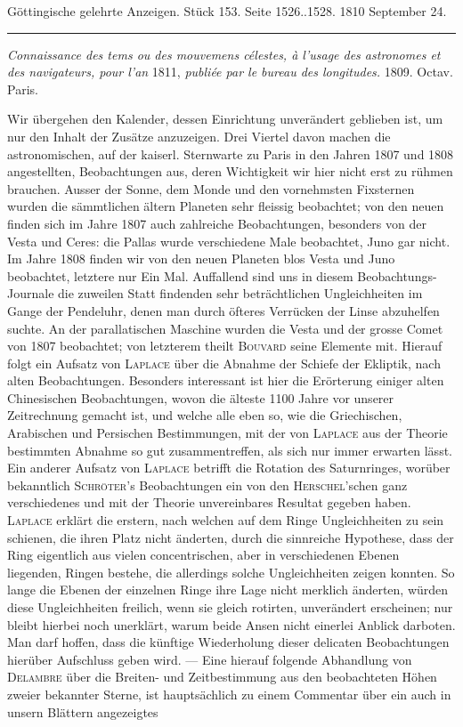 \clearpage
{}
\begin{center}\small Göttingische gelehrte Anzeigen. Stück 153. Seite 1526..1528. 1810 September 24.\\[3pt]\rule{.72\linewidth}{.3pt}\end{center}

\emph{Connaissance des tems ou des mouvemens célestes, à l'usage des astronomes et des navigateurs, pour l'an} 1811, \emph{publiée par le bureau des longitudes.} 1809. Octav. Paris.

Wir übergehen den Kalender, dessen Einrichtung unverändert geblieben ist, um nur den Inhalt der Zusätze anzuzeigen. Drei Viertel davon machen die astronomischen, auf der kaiserl. Sternwarte zu Paris in den Jahren 1807 und 1808 angestellten, Beobachtungen aus, deren Wichtigkeit wir hier nicht erst zu rühmen brauchen. Ausser der Sonne, dem Monde und den vornehmsten Fixsternen wurden die sämmtlichen ältern Planeten sehr fleissig beobachtet; von den neuen finden sich im Jahre 1807 auch zahlreiche Beobachtungen, besonders von der Vesta und Ceres: die Pallas wurde verschiedene Male beobachtet, Juno gar nicht. Im Jahre 1808 finden wir von den neuen Planeten blos Vesta und Juno beobachtet, letztere nur Ein Mal. Auffallend sind uns in diesem Beobachtungs-Journale die zuweilen Statt findenden sehr beträchtlichen Ungleichheiten im Gange der Pendeluhr, denen man durch öfteres Verrücken der Linse abzuhelfen suchte. An der parallatischen Maschine wurden die Vesta und der grosse Comet von 1807 beobachtet; von letzterem theilt \textsc{Bouvard} seine Elemente mit. Hierauf folgt ein Aufsatz von \textsc{Laplace} über die Abnahme der Schiefe der Ekliptik, nach alten Beobachtungen. Besonders interessant ist hier die Erörterung einiger alten Chinesischen Beobachtungen, wovon die älteste 1100 Jahre vor unserer Zeitrechnung gemacht ist, und welche alle eben so, wie die Griechischen, Arabischen und Persischen Bestimmungen, mit der von \textsc{Laplace} aus der Theorie bestimmten Abnahme so gut zusammentreffen, als sich nur immer erwarten lässt. Ein anderer Aufsatz von \textsc{Laplace} betrifft die Rotation des Saturnringes, worüber bekanntlich \textsc{Schröter}'s Beobachtungen ein von den \textsc{Herschel}'schen ganz verschiedenes und mit der Theorie unvereinbares Resultat gegeben haben. \textsc{Laplace} erklärt die erstern, nach welchen auf dem Ringe Ungleichheiten zu sein schienen, die ihren Platz nicht änderten, durch die sinnreiche Hypothese, dass der Ring eigentlich aus vielen concentrischen, aber in verschiedenen Ebenen liegenden, Ringen bestehe, die allerdings solche Ungleichheiten zeigen konnten. So lange die Ebenen der einzelnen Ringe ihre Lage nicht merklich änderten, würden diese Ungleichheiten freilich, wenn sie gleich rotirten, unverändert erscheinen; nur bleibt hierbei noch unerklärt, warum beide Ansen nicht einerlei Anblick darboten. Man darf hoffen, dass die künftige Wiederholung dieser delicaten Beobachtungen hierüber Aufschluss geben wird. — Eine hierauf folgende Abhandlung von \textsc{Delambre} über die Breiten- und Zeitbestimmung aus den beobachteten Höhen zweier bekannter Sterne, ist hauptsächlich zu einem Commentar über ein auch in unsern Blättern angezeigtes 